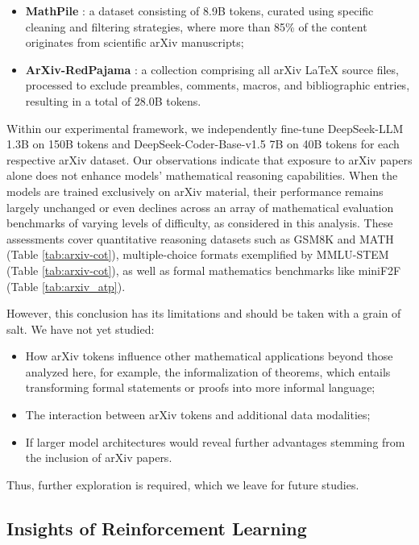 \begin{itemize}[topsep=0pt]
\begin{itemize}[topsep=0pt]
    \item \textbf{MathPile} \citep{mathpile}: a dataset consisting of 8.9B tokens, curated using specific cleaning and filtering strategies, where more than 85\% of the content originates from scientific arXiv manuscripts;
    \item \textbf{ArXiv-RedPajama} \citep{redpajama}: a collection comprising all arXiv LaTeX source files, processed to exclude preambles, comments, macros, and bibliographic entries, resulting in a total of 28.0B tokens.
\end{itemize}

Within our experimental framework, we independently fine-tune DeepSeek-LLM 1.3B on 150B tokens and DeepSeek-Coder-Base-v1.5 7B on 40B tokens for each respective arXiv dataset. Our observations indicate that exposure to arXiv papers alone does not enhance models' mathematical reasoning capabilities. When the models are trained exclusively on arXiv material, their performance remains largely unchanged or even declines across an array of mathematical evaluation benchmarks of varying levels of difficulty, as considered in this analysis. These assessments cover quantitative reasoning datasets such as GSM8K and MATH (Table \ref{tab:arxiv-cot}), multiple-choice formats exemplified by MMLU-STEM (Table \ref{tab:arxiv-cot}), as well as formal mathematics benchmarks like miniF2F (Table \ref{tab:arxiv_atp}).

However, this conclusion has its limitations and should be taken with a grain of salt. We have not yet studied:

\begin{itemize}[topsep=0pt]
    \item How arXiv tokens influence other mathematical applications beyond those analyzed here, for example, the informalization of theorems, which entails transforming formal statements or proofs into more informal language;
    \item The interaction between arXiv tokens and additional data modalities;
    \item If larger model architectures would reveal further advantages stemming from the inclusion of arXiv papers.
\end{itemize}

Thus, further exploration is required, which we leave for future studies.

\subsection{Insights of Reinforcement Learning}

\end{itemize}
